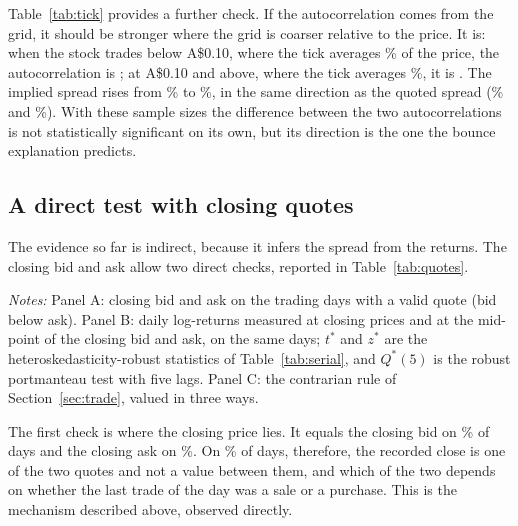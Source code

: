 \documentclass[11pt,a4paper]{article}
\newcommand{\tabnote}[1]{\par\vspace{5pt}\begin{minipage}{\linewidth}\setstretch{1.0}\footnotesize\textit{Notes:} #1\end{minipage}}
\begin{document}
Table~\ref{tab:tick} provides a further check. If the autocorrelation comes from the grid, it should be stronger where the grid is coarser relative to the price. It is: when the stock trades below A\$0.10, where the tick averages \tickLow\% of the price, the autocorrelation is \rhoLow{}; at A\$0.10 and above, where the tick averages \tickHigh\%, it is \rhoHigh{}. The implied spread rises from \rollLow\% to \rollHigh\%, in the same direction as the quoted spread (\qLowSpread\% and \qHighSpread\%). With these sample sizes the difference between the two autocorrelations is not statistically significant on its own, but its direction is the one the bounce explanation predicts.

\subsection{A direct test with closing quotes}\label{sec:quotes}

The evidence so far is indirect, because it infers the spread from the returns. The closing bid and ask allow two direct checks, reported in Table~\ref{tab:quotes}.

\begin{table}[t]
\centering
\caption{Closing prices and quote mid-points}\label{tab:quotes}
\small

\tabnote{Panel A: closing bid and ask on the \qNdays{} trading days with a valid quote (bid below ask). Panel B: daily log-returns measured at closing prices and at the mid-point of the closing bid and ask, on the same \qNmid{} days; $t^{*}$ and $z^{*}$ are the heteroskedasticity-robust statistics of Table~\ref{tab:serial}, and $Q^{*}(5)$ is the robust portmanteau test with five lags. Panel C: the contrarian rule of Section~\ref{sec:trade}, valued in three ways.}
\end{table}

The first check is where the closing price lies. It equals the closing bid on \qAtBid\% of days and the closing ask on \qAtAsk\%. On \qAtQuote\% of days, therefore, the recorded close is one of the two quotes and not a value between them, and which of the two depends on whether the last trade of the day was a sale or a purchase. This is the mechanism described above, observed directly.
\end{document}
